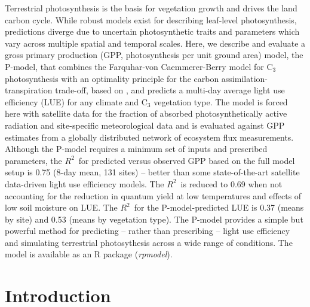 \documentclass{myreport}
\newcommand{\rsq}{$R^2$}
\begin{document}
Terrestrial photosynthesis is the basis for vegetation growth and drives the land carbon cycle. %
While robust models exist for describing leaf-level photosynthesis, predictions diverge due to uncertain photosynthetic traits and parameters which vary across multiple spatial and temporal scales. Here, we describe and evaluate a gross primary production (GPP, photosynthesis per unit ground area) model, the P-model, that combines the Farquhar-von Caemmerer-Berry model for C$_3$ photosynthesis with an optimality principle for the carbon assimilation-transpiration trade-off, based on \citet{wang17natpl}, and predicts a multi-day average light use efficiency (LUE) for any climate and C$_3$ vegetation type. The model is forced here with satellite data for the fraction of absorbed photosynthetically active radiation and site-specific meteorological data and is evaluated against GPP estimates from a globally distributed network of ecosystem flux measurements. Although the P-model requires a minimum set of inputs and prescribed parameters, the \rsq\ for predicted versus observed GPP based on the full model setup is 0.75 (8-day mean, 131 sites) -- better than some state-of-the-art satellite data-driven light use efficiency models. The \rsq\ is reduced to 0.69 when not accounting for the reduction in quantum yield at low temperatures and effects of low soil moisture on LUE. The \rsq\ for the P-model-predicted LUE is 0.37 (means by site) and 0.53 (means by vegetation type). The P-model provides a simple but powerful method for predicting -- rather than prescribing -- light use efficiency and simulating terrestrial photosythesis across a wide range of conditions. The model is available as an R package (\textit{rpmodel}).

\section{Introduction}
\end{document}
